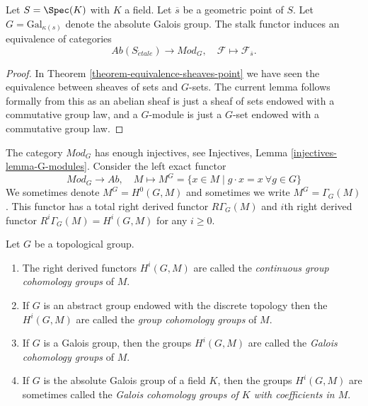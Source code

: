 \begin{lemma}
\label{lemma-equivalence-abelian-sheaves-point}
Let $S = \Spec(K)$ with $K$ a field.
Let $\overline{s}$ be a geometric point of $S$.
Let $G = \text{Gal}_{\kappa(s)}$ denote the absolute Galois group.
The stalk functor induces an equivalence of categories
$$
\textit{Ab}(S_{\acute{e}tale}) \longrightarrow \textit{Mod}_G,
\quad
\mathcal{F} \longmapsto \mathcal{F}_{\overline{s}}.
$$
\end{lemma}

\begin{proof}
In
Theorem \ref{theorem-equivalence-sheaves-point}
we have seen the equivalence between sheaves of sets and $G$-sets.
The current lemma follows formally from this as an abelian sheaf is just
a sheaf of sets endowed with a commutative group law, and a $G$-module
is just a $G$-set endowed with a commutative group law.
\end{proof}

\noindent
The category $\textit{Mod}_G$ has enough injectives, see
Injectives, Lemma \ref{injectives-lemma-G-modules}.
Consider the left exact functor
$$
\textit{Mod}_G \longrightarrow \textit{Ab},
\quad
M \longmapsto M^G =
\{x \in M \mid g \cdot x = x\ \forall g \in G\}
$$
We sometimes denote $M^G = H^0(G, M)$ and sometimes we write
$M^G = \Gamma_G(M)$. This functor has a total right derived functor
$R\Gamma_G(M)$ and $i$th right derived functor
$R^i\Gamma_G(M) = H^i(G, M)$ for any $i \geq 0$.

\begin{definition}
\label{definition-galois-cohomology}
Let $G$ be a topological group.
\begin{enumerate}
\item The right derived functors $H^i(G, M)$ are called the
{\it continuous group cohomology groups} of $M$.
\item If $G$ is an abstract group endowed with the discrete topology
then the $H^i(G, M)$ are called the {\it group cohomology groups} of $M$.
\item If $G$ is a Galois group, then the groups $H^i(G, M)$ are called
the {\it Galois cohomology groups} of $M$.
\item If $G$ is the absolute Galois group of a field $K$, then the groups
$H^i(G, M)$ are sometimes called the {\it Galois cohomology groups of $K$
with coefficients in $M$}.
\end{enumerate}
\end{definition}

